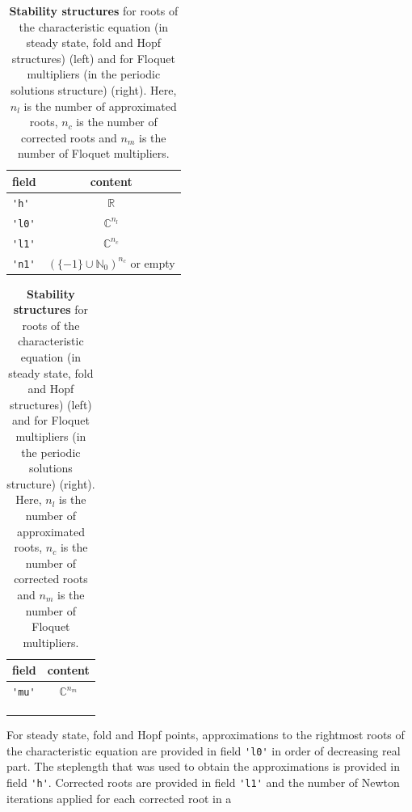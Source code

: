 \documentclass[10pt]{scrartcl}
\newcommand{\RR}{\mathbb{R}}
\newcommand{\NN}{\mathbb{N}}
\newcommand{\CC}{\mathbb{C}}
\newcommand{\blist}[1]{\mbox{\lstinline!#1!}}
\begin{document}
\begin{table}[htbp]
  \begin{center}
    \begin{subtable}[t]{0.45\textwidth}
      \begin{tabular}[t]{lc}\hline\noalign{\smallskip}
        field & content     \\\hline\noalign{\smallskip}
        \blist{'h'}     & $\RR$       \\
        \blist{'l0'}    & $\CC^{n_l}$ \\
        \blist{'l1'}    & $\CC^{n_c}$ \\
        \blist{'n1'}    & $(\{-1\}\cup\NN_0)^{n_c}$ or empty\\\hline
      \end{tabular}
      \caption{Structure in field \blist{'stability'} for steady
        state, fold and Hopf points of Table~\ref{point_structures}}
    \end{subtable}\qquad
    \begin{subtable}[t]{0.45\textwidth}
      \begin{tabular}[t]{lc}\hline\noalign{\smallskip}
        field & content     \\\hline\noalign{\smallskip}
        \blist{'mu'}    & $\CC^{n_m}$ \\ \\ \\ \\\hline
      \end{tabular}
      \caption{Structure in field \blist{'stability'} for periodic
        orbit points of Table~\ref{point_structures}}
    \end{subtable}
  \end{center}
  \caption{\label{stab_structures}
    \textbf{\textsf{Stability structures}} for roots of the characteristic equation
    (in steady state, fold and Hopf structures) (left)
    and for Floquet multipliers (in the periodic solutions structure) (right). 
    Here, $n_l$ is the number of approximated roots,
    $n_c$ is the number of corrected roots and $n_m$ is the number
    of Floquet multipliers.}
\end{table}
For steady state, fold and Hopf points, approximations to the
rightmost roots of the characteristic equation are provided in field
\blist{'l0'} in order of decreasing real part.  The steplength that
was used to obtain the approximations is provided in field
\blist{'h'}. Corrected roots are provided in field \blist{'l1'} and
the number of Newton iterations applied for each corrected root in a
\end{document}
